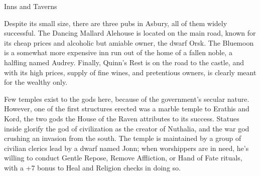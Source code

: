 \documentclass{report}
\theoremstyle{definition}
\begin{document}
\begin{labeling}{Inns and Taverns}
\item [Inns and Taverns] Despite its small size, there are three pubs in Asbury, all of them widely successful.  The Dancing Mallard Alehouse is located on the main road, known for its cheap prices and alcoholic but amiable owner, the dwarf Orsk.  The Bluemoon is a somewhat more expensive inn run out of the home of a fallen noble, a halfling named Audrey.  Finally, Quinn's Rest is on the road to the castle, and with its high prices, supply of fine wines, and pretentious owners, is clearly meant for the wealthy only.
\item [Religion] Few temples exist to the gods here, because of the government's secular nature.  However, one of the first structures erected was a marble temple to Erathis and Kord, the two gods the House of the Raven attributes to its success.  Statues inside glorify the god of civilization as the creator of Nuthalia, and the war god crushing an invasion from the south.  The temple is maintained by a group of civilian clerics lead by a dwarf named Jonn; when worshippers are in need, he's willing to conduct Gentle Repose, Remove Affliction, or Hand of Fate rituals, with a +7 bonus to Heal and Religion checks in doing so.
\end{labeling}
\end{document}
